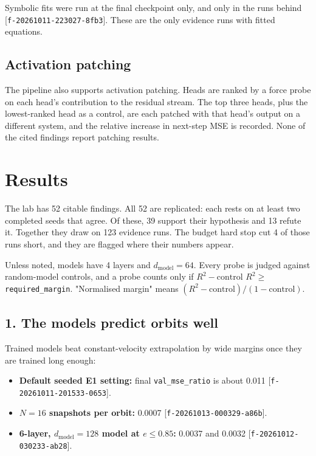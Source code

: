 \documentclass{article}
\begin{document}
Symbolic fits were run at the final checkpoint only, and only in the runs behind [\texttt{f-20261011-223027-8fb3}]. These are the only evidence runs with fitted equations.

\subsection{Activation patching}

The pipeline also supports activation patching. Heads are ranked by a force probe on each head's contribution to the residual stream. The top three heads, plus the lowest-ranked head as a control, are each patched with that head's output on a different system, and the relative increase in next-step MSE is recorded. None of the cited findings report patching results.

\section{Results}

The lab has 52 citable findings. All 52 are replicated: each rests on at least two completed seeds that agree. Of these, 39 support their hypothesis and 13 refute it. Together they draw on 123 evidence runs. The budget hard stop cut 4 of those runs short, and they are flagged where their numbers appear.

Unless noted, models have 4 layers and $d_{\text{model}} = 64$. Every probe is judged against random-model controls, and a probe counts only if $R^2 - \text{control } R^2 \ge$ \texttt{required\_margin}. "Normalised margin" means $(R^2 - \text{control})/(1 - \text{control})$.

\subsection{1. The models predict orbits well}

Trained models beat constant-velocity extrapolation by wide margins once they are trained long enough:

\begin{itemize}
\item \textbf{Default seeded E1 setting:} final \texttt{val\_mse\_ratio} is about 0.011 [\texttt{f-20261011-201533-0653}].
\item \textbf{$N = 16$ snapshots per orbit:} 0.0007 [\texttt{f-20261013-000329-a86b}].
\item \textbf{6-layer, $d_{\text{model}} = 128$ model at $e \le 0.85$:} 0.0037 and 0.0032 [\texttt{f-20261012-030233-ab28}].
\end{itemize}
\end{document}
